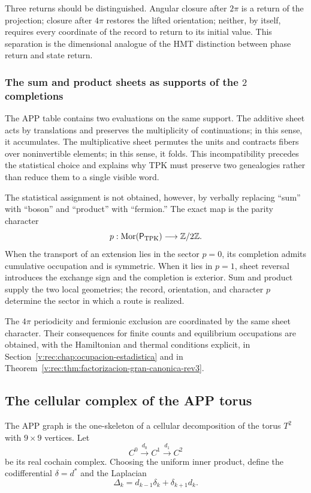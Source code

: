 Three returns should be distinguished. Angular closure after \(2\pi\) is a
return of the projection; closure after \(4\pi\) restores the lifted
orientation; neither, by itself, requires every coordinate of the record
to return to its initial value. This separation is the dimensional analogue of the
HMT distinction between phase return and state return.

\subsubsection{The sum and product sheets as supports of the \(2\) completions}
\label{v:rec:completaciones:section:06}

The APP table contains two evaluations on the same support. The
additive sheet acts by translations and preserves the multiplicity of
continuations; in this sense, it accumulates. The multiplicative sheet
permutes the units and contracts fibers over noninvertible elements; in
this sense, it folds. This incompatibility precedes the statistical
choice and explains why TPK must preserve two genealogies rather than
reduce them to a single visible word.

The statistical assignment is not obtained, however, by verbally replacing
``sum'' with ``boson'' and ``product'' with ``fermion.'' The exact map is
the parity character
\[
 p:\operatorname{Mor}(\mathsf P_{\rm TPK})\longrightarrow\mathbb Z/2\mathbb Z.
\]
When the transport of an extension lies in the sector \(p=0\), its
completion admits cumulative occupation and is symmetric. When it lies in
\(p=1\), sheet reversal introduces the exchange sign and the
completion is exterior. Sum and product supply the two
local geometries; the record, orientation, and character \(p\) determine the
sector in which a route is realized.

The \(4\pi\) periodicity and fermionic exclusion are coordinated by
the same sheet character. Their consequences for finite counts and
equilibrium occupations are obtained, with the Hamiltonian and thermal
conditions explicit, in
Section~\ref{v:rec:chap:ocupacion-estadistica} and in
Theorem~\ref{v:rec:thm:factorizacion-gran-canonica-rev3}.

\subsection{The cellular complex of the APP torus}
\label{v:rec:completaciones:section:08}

The APP graph is the one-skeleton of a cellular decomposition of the torus
\(T^2\) with \(9\times9\) vertices. Let
\[
 C^0\xrightarrow{d_0}C^1\xrightarrow{d_1}C^2
\]
be its real cochain complex. Choosing the uniform inner product,
define the codifferential \(\delta=d^*\) and the Laplacian
\[
 \Delta_k=d_{k-1}\delta_k+\delta_{k+1}d_k.
\]


